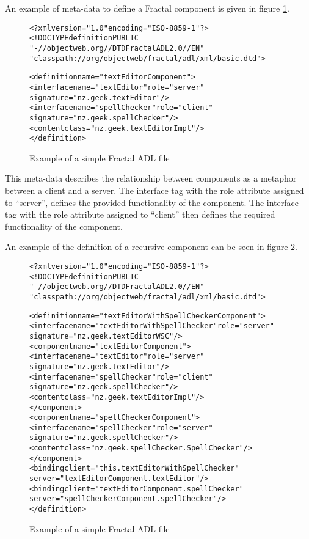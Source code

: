 An example of meta-data to define a Fractal component is given in figure \ref{fractalmetadata}.

\begin{figure}[htp]
\begin{center}
\begin{alltt}
<?xml version="1.0" encoding="ISO-8859-1" ?>
<!DOCTYPE definition PUBLIC 
    "-//objectweb.org//DTD Fractal ADL 2.0//EN" 
    "classpath://org/objectweb/fractal/adl/xml/basic.dtd">

<definition name="textEditorComponent">
  <interface name="textEditor" role = "server" 
   signature = "nz.geek.textEditor"/>
  <interface name="spellChecker" role = "client" 
   signature = "nz.geek.spellChecker"/>
  <content class="nz.geek.textEditorImpl"/>
</definition>
\end{alltt}
  \caption[Fractal ADL Example]{Example of a simple Fractal ADL file}
  \label{fractalmetadata}
\end{center}
\end{figure}

This meta-data describes the relationship between components as a metaphor between a client and a server.
The interface tag with the role attribute assigned to ``server'', defines the provided functionality of the component.
The interface tag with the role attribute assigned to ``client'' then defines the required functionality of the component.  

An example of the definition of a recursive component can be seen in figure \ref{fractalrecursve}.

\begin{figure}[htp]
\begin{center}
\begin{alltt}
<?xml version="1.0" encoding="ISO-8859-1" ?>
<!DOCTYPE definition PUBLIC 
    "-//objectweb.org//DTD Fractal ADL 2.0//EN" 
    "classpath://org/objectweb/fractal/adl/xml/basic.dtd">

<definition name="textEditorWithSpellCheckerComponent">
  <interface name="textEditorWithSpellChecker" role="server" 
   signature="nz.geek.textEditorWSC"/>
  <component name="textEditorComponent">
    <interface name="textEditor" role="server" 
     signature="nz.geek.textEditor"/>
    <interface name="spellChecker" role="client" 
     signature="nz.geek.spellChecker"/>
    <content class="nz.geek.textEditorImpl"/>
  </component>
  <component name="spellCheckerComponent">
    <interface name="spellChecker" role="server" 
     signature="nz.geek.spellChecker"/>
    <content class="nz.geek.spellChecker.SpellChecker"/>
  </component>
  <binding client="this.textEditorWithSpellChecker" 
   server="textEditorComponent.textEditor"/>
  <binding client="textEditorComponent.spellChecker" 
   server="spellCheckerComponent.spellChecker"/>
</definition>
\end{alltt}
  \caption[Fractal ADL Example]{Example of a simple Fractal ADL file}
  \label{fractalrecursve}
\end{center}
\end{figure}

